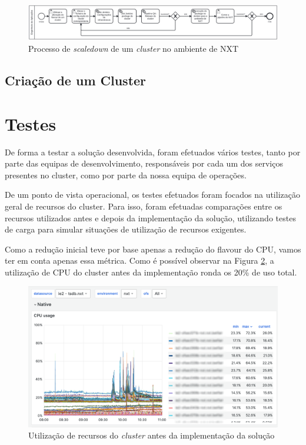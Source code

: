 \begin{figure}[H]
  \centerline{\includegraphics[scale=0.12]{media/content/impl/scaledown_nxt.png}}
  \caption{Processo de \textit{scaledown} de um \textit{cluster} no ambiente de NXT}
  \label{scaledown-nxt}
\end{figure}

\subsection{Criação de um Cluster}


\section{Testes}

De forma a testar a solução desenvolvida, foram efetuados vários testes, tanto por parte das
equipas de desenvolvimento, responsáveis por cada um dos serviços presentes no \gls{cluster},
como por parte da nossa equipa de operações. 

De um ponto de vista operacional, os testes efetuados foram focados na utilização geral de
recursos do \gls{cluster}. Para isso, foram efetuadas comparações entre os recursos utilizados
antes e depois da implementação da solução, utilizando testes de carga para simular situações
de utilização de recursos exigentes.

Como a redução inicial teve por base apenas a redução do \gls{flavour} do \ac{CPU}, vamos ter em conta
apenas essa métrica. Como é possível observar na Figura \ref{usage-before}, a utilização de \ac{CPU}
do \gls{cluster} antes da implementação ronda os 20\% de uso total.

\begin{figure}[H]
  \centerline{\includegraphics[scale=0.25]{media/content/impl/grafana-before-1.png}}
  \caption{Utilização de recursos do \textit{cluster} antes da implementação da solução}
  \label{usage-before}
\end{figure}

